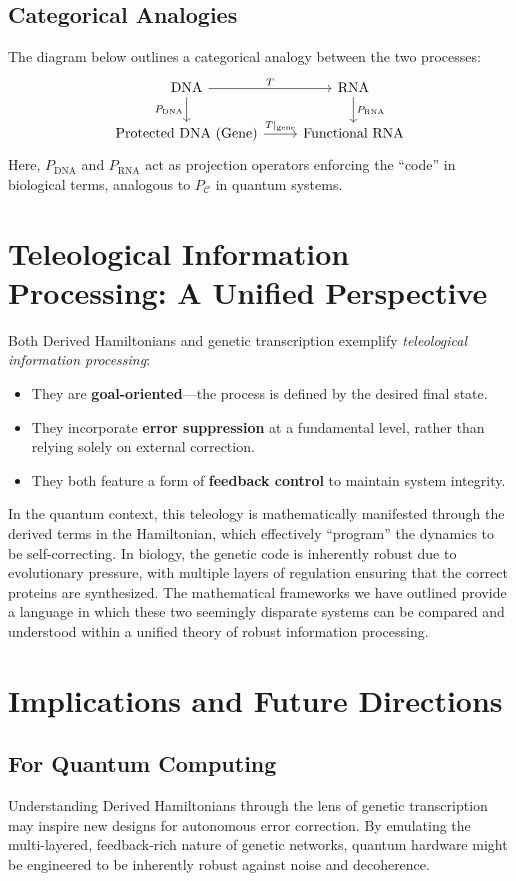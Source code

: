 \documentclass[11pt]{article}
\begin{document}
\subsection{Categorical Analogies}
The diagram below outlines a categorical analogy between the two processes:
\[
\begin{tikzcd}
\text{DNA} \arrow[r, "T"] \arrow[d, "P_{\text{DNA}}"'] & \text{RNA} \arrow[d, "P_{\text{RNA}}"] \\
\text{Protected DNA (Gene)} \arrow[r, "T|_{\text{gene}}"] & \text{Functional RNA}
\end{tikzcd}
\]
Here, \(P_{\text{DNA}}\) and \(P_{\text{RNA}}\) act as projection operators enforcing the “code” in biological terms, analogous to \(P_{\mathcal{C}}\) in quantum systems.

\section{Teleological Information Processing: A Unified Perspective}
Both Derived Hamiltonians and genetic transcription exemplify \emph{teleological information processing}:
\begin{itemize}
    \item They are \textbf{goal-oriented}—the process is defined by the desired final state.
    \item They incorporate \textbf{error suppression} at a fundamental level, rather than relying solely on external correction.
    \item They both feature a form of \textbf{feedback control} to maintain system integrity.
\end{itemize}

In the quantum context, this teleology is mathematically manifested through the derived terms in the Hamiltonian, which effectively “program” the dynamics to be self-correcting. In biology, the genetic code is inherently robust due to evolutionary pressure, with multiple layers of regulation ensuring that the correct proteins are synthesized. The mathematical frameworks we have outlined provide a language in which these two seemingly disparate systems can be compared and understood within a unified theory of robust information processing.

\section{Implications and Future Directions}
\subsection{For Quantum Computing}
Understanding Derived Hamiltonians through the lens of genetic transcription may inspire new designs for autonomous error correction. By emulating the multi-layered, feedback-rich nature of genetic networks, quantum hardware might be engineered to be inherently robust against noise and decoherence.
\end{document}
